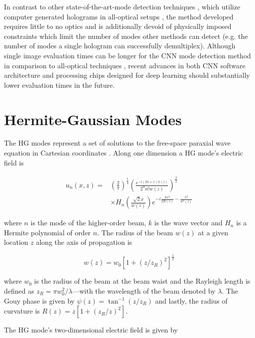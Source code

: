\documentclass[10pt,journal,compsoc]{IEEEtran}
\begin{document}
 In contrast to other state-of-the-art-mode detection techniques \cite{forbes2016creation}, which utilize computer generated holograms in all-optical setups \cite{schmidt2011real}, the method developed requires little to no optics and is additionally devoid of physically imposed constraints which limit the number of modes other methods can detect (e.g. the number of modes a single hologram can successfully demultiplex). Although single image evaluation times can be longer for the CNN mode detection method in comparison to all-optical techniques \cite{lyu2017fast}, recent advances in both CNN software architecture and processing chips designed for deep learning \cite{jouppi2017datacenter} should substantially lower evaluation times in the future.



\section*{Hermite-Gaussian Modes}\label{sec:hg}

The HG modes represent a set of solutions to the free-space paraxial wave equation in Cartesian coordinates \cite{lasers}. Along one dimension a HG mode's electric field is

\begin{align}
u_n(x, z)=&\left(\frac{2}{\pi}\right)^{\frac{1}{4}}\left( \frac{e^{-i(2n+1)\psi(z)}}{2^nn!w(z)}\right)^{\frac{1}{2}} \nonumber \\
&\times H_n\left(\frac{\sqrt{2}x}{w(z)}\right)e^{-i\frac{kx^2}{2R(z)}-\frac{x^2}{w^2(z)}}
\label{1DHE}
\end{align}

\noindent where $n$ is the mode of the higher-order beam, $k$ is the wave vector and $H_n$ is a Hermite polynomial of order $n$. The radius of the beam $w(z)$ at a given location $z$ along the axis of propagation is 

\begin{equation}
w(z)=w_0\left[1+\left(z/z_R\right)^2\right]^\frac{1}{2}
\end{equation}

\noindent where $w_0$ is the radius of the beam at the beam waist and the Rayleigh length is defined as $z_R=\pi w_0^2/\lambda$---with the wavelength of the beam denoted by $\lambda$. The Gouy phase is given by $\psi(z)=\tan^{-1}\left(z/z_R\right)$ and lastly, the radius of curvature is $R(z)=z\left[1+\left(z_R/z\right)^2\right]$. 

The HG mode's two-dimensional electric field is given by
\end{document}
